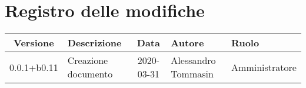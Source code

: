 \section*{Registro delle modifiche}

\begin{center}
	\begin{longtable}{|c|p{3.5cm}|c|p{3cm}|p{3cm}|}
	\hline
	\rowcolor{lighter-grayer}
	\textbf{Versione} & \textbf{Descrizione} & \textbf{Data} & \textbf{Autore} & \textbf{Ruolo} \\
	\hline
	\endfirsthead

	0.0.1+b0.11 & Creazione documento & 2020-03-31 & Alessandro Tommasin & Amministratore \\
	\hline
	\hline
	\end{longtable}
\end{center}